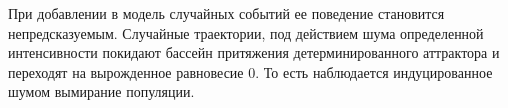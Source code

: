        

        

    При добавлении в модель случайных событий ее поведение становится непредсказуемым. Случайные траектории, под действием шума определенной интенсивности покидают бассейн притяжения детерминированного аттрактора и переходят на вырожденное равновесие \(0\). То есть наблюдается индуцированное шумом вымирание популяции. 
